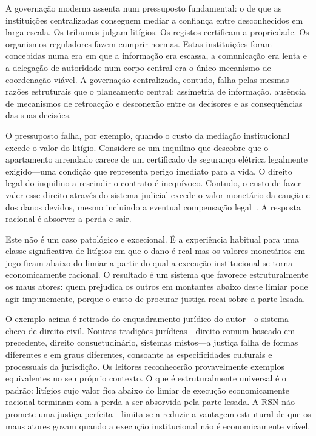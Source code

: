 \documentclass[11pt,a4paper,twocolumn]{article}
\begin{document}
A governação moderna assenta num pressuposto fundamental: o de que as instituições centralizadas conseguem mediar a confiança entre desconhecidos em larga escala. Os tribunais julgam litígios. Os registos certificam a propriedade. Os organismos reguladores fazem cumprir normas. Estas instituições foram concebidas numa era em que a informação era escassa, a comunicação era lenta e a delegação de autoridade num corpo central era o único mecanismo de coordenação viável. A governação centralizada, contudo, falha pelas mesmas razões estruturais que o planeamento central: assimetria de informação, ausência de mecanismos de retroacção e desconexão entre os decisores e as consequências das suas decisões.

O pressuposto falha, por exemplo, quando o custo da mediação institucional excede o valor do litígio. Considere-se um inquilino que descobre que o apartamento arrendado carece de um certificado de segurança elétrica legalmente exigido---uma condição que representa perigo imediato para a vida. O direito legal do inquilino a rescindir o contrato é inequívoco. Contudo, o custo de fazer valer esse direito através do sistema judicial excede o valor monetário da caução e dos danos devidos, mesmo incluindo a eventual compensação legal~\cite{czcourtfees}. A resposta racional é absorver a perda e sair.

Este não é um caso patológico e excecional. É a experiência habitual para uma classe significativa de litígios em que o dano é real mas os valores monetários em jogo ficam abaixo do limiar a partir do qual a execução institucional se torna economicamente racional. O resultado é um sistema que favorece estruturalmente os maus atores: quem prejudica os outros em montantes abaixo deste limiar pode agir impunemente, porque o custo de procurar justiça recai sobre a parte lesada.

O exemplo acima é retirado do enquadramento jurídico do autor---o sistema checo de direito civil. Noutras tradições jurídicas---direito comum baseado em precedente, direito consuetudinário, sistemas mistos---a justiça falha de formas diferentes e em graus diferentes, consoante as especificidades culturais e processuais da jurisdição. Os leitores reconhecerão provavelmente exemplos equivalentes no seu próprio contexto. O que é estruturalmente universal é o padrão: litígios cujo valor fica abaixo do limiar de execução economicamente racional terminam com a perda a ser absorvida pela parte lesada. A RSN não promete uma justiça perfeita---limita-se a reduzir a vantagem estrutural de que os maus atores gozam quando a execução institucional não é economicamente viável.
\end{document}
